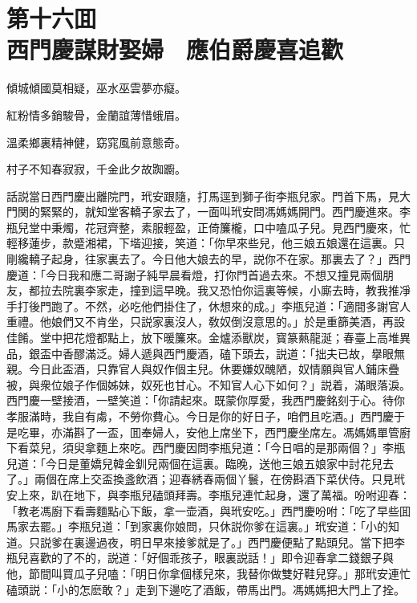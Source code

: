
\chapter*{第十六囬　\\西門慶謀財娶婦　應伯爵慶喜追歡}


\begin{myquote}
傾城傾國莫相疑，巫水巫雲夢亦癡。

紅粉情多銷駿骨，金蘭誼薄惜蛾眉。

溫柔鄉裏精神健，窈窕風前意態奇。

村子不知春寂寂，千金此夕故踟躕。
\end{myquote}

話説當日西門慶出離院門，玳安跟隨，打馬逕到獅子街李瓶兒家。門首下馬，見大門関的緊緊的，就知堂客轎子家去了，一面叫玳安問馮媽媽開門。西門慶進來。李瓶兒堂中秉燭，花冠齊整，素服輕盈，正倚簾櫳，口中嗑瓜子兒。見西門慶來，忙輕移蓮步，款蹙湘裙，下堦迎接，笑道：「你早來些兒，他三娘五娘還在這裏。只剛纔轎子起身，往家裏去了。今日他大娘去的早，説你不在家。那裏去了？」西門慶道：「今日我和應二哥謝子純早晨看燈，打你門首過去來。不想又撞見兩個朋友，都拉去院裏李家走，撞到這早晚。我又恐怕你這裏等候，小廝去時，教我推凈手打後門跑了。不然，必吃他們掛住了，休想來的成。」李瓶兒道：「適間多謝官人重禮。他娘們又不肯坐，只説家裏沒人，敎奴倒沒意思的。」於是重篩美酒，再設佳餚。堂中把花燈都點上，放下暖簾來。金爐添獸炭，寳篆爇龍涎；春臺上高堆異品，銀盃中香醪滿泛。婦人遞與西門慶酒，磕下頭去，説道：「拙夫已故，擧眼無親。今日此盃酒，只靠官人與奴作個主兒。休要嫌奴醜陋，奴情願與官人鋪床疊被，與衆位娘子作個姊妹，奴死也甘心。不知官人心下如何？」説着，滿眼落淚。西門慶一壁接酒，一壁笑道：「你請起來。既蒙你厚愛，我西門慶銘刻于心。待你孝服滿時，我自有䖏，不勞你費心。今日是你的好日子，咱們且吃酒。」西門慶于是吃畢，亦滿斟了一盃，囬奉婦人，安他上席坐下，西門慶坐席左。馮媽媽單管廚下看菜兒，須臾拿麵上來吃。西門慶因問李瓶兒道：「今日唱的是那兩個？」李瓶兒道：「今日是董嬌兒韓金釧兒兩個在這裏。臨晚，送他三娘五娘家中討花兒去了。」兩個在席上交盃換盞飲酒；迎春綉春兩個丫鬟，在傍斟酒下菜伏侍。只見玳安上來，趴在地下，與李瓶兒磕頭拜壽。李瓶兒連忙起身，還了萬福。吩咐迎春：「教老馮廚下看壽麵點心下飯，拿一壶酒，與玳安吃。」西門慶吩咐：「吃了早些囬馬家去罷。」李瓶兒道：「到家裏你娘問，只休説你爹在這裏。」玳安道：「小的知道。只説爹在裏邊過夜，明日早來接爹就是了。」西門慶便點了點頭兒。當下把李瓶兒喜歡的了不的，説道：「好個乖孩子，眼裏説話！」即令迎春拿二錢銀子與他，節間叫買瓜子兒嗑：「明日你拿個樣兒來，我替你做雙好鞋兒穿。」那玳安連忙磕頭説：「小的怎麽敢？」走到下邊吃了酒飯，帶馬出門。馮媽媽把大門上了拴。


